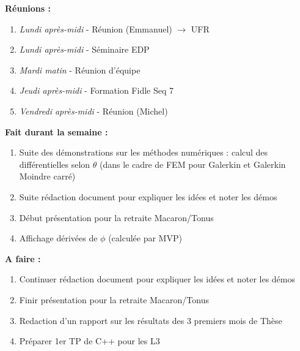 \textbf{Réunions :}
\begin{enumerate}[label=\textbullet]
	\item \textit{Lundi après-midi} - Réunion (Emmanuel) $\rightarrow$ UFR
	\item \textit{Lundi après-midi} - Séminaire EDP
	\item \textit{Mardi matin} - Réunion d'équipe
	\item \textit{Jeudi après-midi} - Formation Fidle Seq 7
	\item \textit{Vendredi après-midi} - Réunion (Michel)
\end{enumerate}
\textbf{Fait durant la semaine :}
\begin{enumerate}[label=\textbullet]
	\item Suite des démonstrations sur les méthodes numériques : calcul des différentielles selon $\theta$ (dans le cadre de FEM pour Galerkin et Galerkin Moindre carré)
	\item Suite rédaction document pour expliquer les idées et noter les démos
	\item Début présentation pour la retraite Macaron/Tonus
	\item Affichage dérivées de $\phi$ (calculée par MVP)
\end{enumerate}
\textbf{A faire :}
\begin{enumerate}[label=\textbullet]
	\item Continuer rédaction document pour expliquer les idées et noter les démos
	\item Finir présentation pour la retraite Macaron/Tonus
	\item Redaction d'un rapport sur les résultats des 3 premiers mois de Thèse
	\item Préparer 1er TP de C++ pour les L3
\end{enumerate}